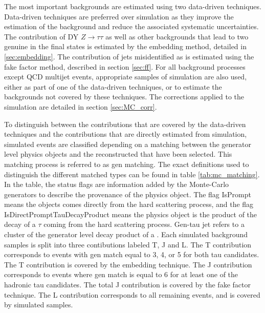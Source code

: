 The most important backgrounds are estimated using two data-driven techniques. Data-driven techniques are preferred over simulation as they improve the estimation of the background and reduce the associated systematic uncertainties. The contribution of DY $Z \rightarrow \tau\tau$ as well as other backgrounds that lead to two genuine \tauh in the final states is estimated by the embedding method, detailed in \ref{sec:embedding}. The contribution of jets misidentified as \tauh is estimated using the fake factor method, described in section \ref{sec:ff}. For all background processes except QCD multijet events, appropriate samples of simulation are also used, either as part of one of the data-driven techniques, or to estimate the backgrounds not covered by these techniques. The corrections applied to the simulation are detailed in section \ref{sec:MC_corr}.

To distinguish between the contributions that are covered by the data-driven techniques and the contributions that are directly estimated from simulation, simulated events are classified depending on a matching between the generator level physics objects and the reconstructed \tauh that have been selected. This matching process is referred to as gen matching. The exact definitions used to distinguish the different matched types can be found in table \ref{tab:mc_matching}. In the table, the status flags are information added by the Monte-Carlo generators to describe the provenance of the physics object. The flag IsPrompt means the objects comes directly from the hard scattering process, and the flag IsDirectPromptTauDecayProduct means the physics object is the product of the decay of a $\tau$ coming from the hard scattering process. Gen-tau jet refers to a cluster of the generator level decay product of a \tauh. Each simulated background samples is split into three contibutions labeled T, J and L. The T contribution corresponds to events with gen match equal to 3, 4, or 5 for both tau candidates. The T contribution is covered by the embedding technique. The J contribution corresponds to events where gen match is equal to 6 for at least one of the hadronic tau candidates. The total J contribution is covered by the fake factor technique. The L contribution corresponds to all remaining events, and is covered by simulated samples.




